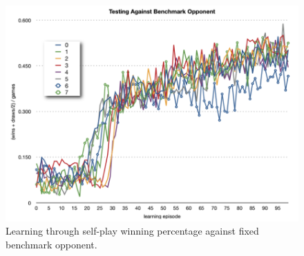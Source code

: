 \begin{figure}[hbtp]
\center
\includegraphics[scale=0.5]{fig13}
\caption{Learning through self-play winning percentage against fixed benchmark opponent.}
\label{fig:sp_learning2}
\end{figure}

